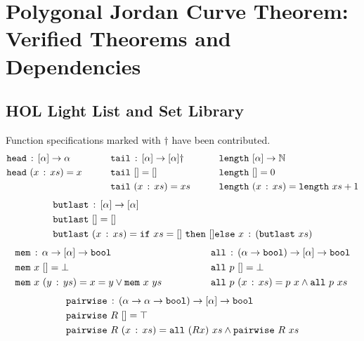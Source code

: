 \label{app:JordanVerification}
\chapter{Polygonal Jordan Curve Theorem: Verified Theorems and Dependencies}

\section{HOL Light List and Set Library}
Function specifications marked with $\dag$ have been contributed.
\begin{alignat*}{3}
  & \texttt{head}\,:\,[\alpha] \rightarrow \alpha &\qquad
  & \texttt{tail}\,:\,[\alpha] \rightarrow [\alpha]\dag &\qquad
  & \texttt{length}\ [\alpha]\rightarrow \mathbb{N}\\
  & \texttt{head}\ (x\,:\,xs) = x &\qquad
  & \texttt{tail}\ [] = [] &\qquad
  & \texttt{length}\ [] = 0\\
  & &\qquad
  &\texttt{tail}\ (x\,:\,xs) = xs &\qquad
  & \texttt{length}\ (x\,:\,xs) = \texttt{length}\ xs + 1
\end{alignat*}
\begin{align*}
  &\code{butlast}\,:\,[\alpha] \rightarrow [\alpha]\\
  &\code{butlast}\ [] = []\\
  &\code{butlast}\ (\cons{x}{xs}) = \code{if}\ xs=[]\ \code{then}\ [] \code{else}\ \cons{x}{(\code{butlast}\ xs)}
\end{align*}
\begin{align*}
  & \texttt{mem}\,:\,\alpha \rightarrow [\alpha] \rightarrow \texttt{bool} &\qquad\qquad
  & \texttt{all}\,:\,(\alpha\rightarrow\texttt{bool}) \rightarrow [\alpha] \rightarrow \texttt{bool}\\
  & \texttt{mem}\ x\ [] = \bot &\qquad\qquad
  & \texttt{all}\ p\ [] = \bot\\
  & \texttt{mem}\ x\ (y\,:\,ys) = x = y \vee \texttt{mem}\ x\ ys &\qquad\qquad
  & \texttt{all}\ p\ (x\,:\,xs) = p\ x \wedge \texttt{all}\ p\ xs   
\end{align*}
\begin{align*}
  & \texttt{pairwise}\,:\,(\alpha \rightarrow \alpha \rightarrow \texttt{bool}) \rightarrow [\alpha] \rightarrow \texttt{bool}\\
  & \texttt{pairwise}\ R\ [] = \top\\
  & \texttt{pairwise}\ R\ (x\,:\,xs) = \texttt{all}\ (R x)\ xs \wedge \texttt{pairwise}\ R\ xs
\end{align*}\\
